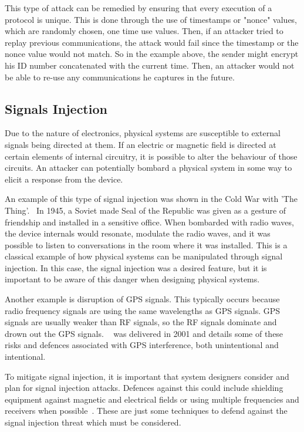 This type of attack can be remedied by ensuring that every execution of a protocol is unique. This is done through the use of
timestamps or "nonce" values, which are randomly chosen, one time use values. Then, if an attacker tried to replay previous
communications, the attack would fail since the timestamp or the nonce value would not match. So in the example above, the
sender might encrypt his ID number concatenated with the current time. Then, an attacker would not be able to re-use any
communications he captures in the future.

\subsection{Signals Injection}
Due to the nature of electronics, physical systems are susceptible to external signals being directed at them. If an electric or 
magnetic field is directed at certain elements of internal circuitry, it is possible to alter the behaviour of those circuits. An attacker
can potentially bombard a physical system in some way to elicit a response from the device.

An example of this type of signal injection was shown in the Cold War with 'The Thing'.~\cite{thing} In 1945, a Soviet made Seal of the 
Republic was given as a gesture of friendship and installed in a sensitive office. When bombarded with radio waves, the device internals
would resonate, modulate the radio waves, and it was possible to listen to conversations in the room where it was installed. This is a
classical example of how physical systems can be manipulated through signal injection. In this case, the signal injection was a desired
feature, but it is important to be aware of this danger when designing physical systems.

Another example is disruption of GPS signals. This typically occurs because radio frequency signals are using the same wavelengths as
GPS signals. GPS signals are usually weaker than RF signals, so the RF signals dominate and drown out the GPS signals. ~\cite{gpsdisruption} 
was delivered in 2001 and details some of these risks and defences associated with GPS interference, both unintentional and intentional.

To mitigate signal injection, it is important that system designers consider and plan for signal injection attacks. Defences against this could
include shielding equipment against magnetic and electrical fields or using multiple frequencies and receivers when possible~\cite{gpsdisruption}.
These are just some techniques to defend against the signal injection threat which must be considered.

